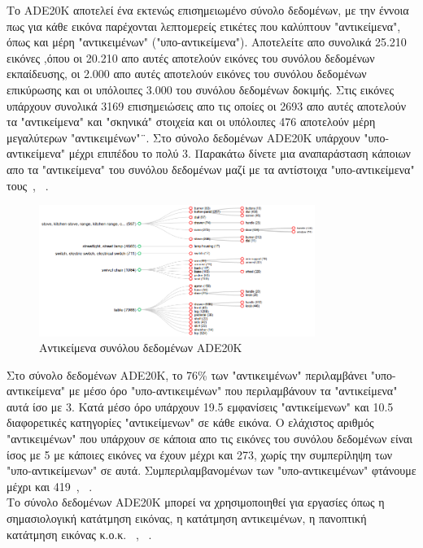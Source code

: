 \documentclass[12pt]{article}
\numberwithin{equation}{section}
\begin{document}
Το ADE20K αποτελεί ένα εκτενώς επισημειωμένο σύνολο δεδομένων, με την έννοια πως για κάθε εικόνα παρέχονται λεπτομερείς ετικέτες που καλύπτουν "αντικείμενα", όπως και μέρη "αντικειμένων" ("υπο-αντικείμενα"). Αποτελείτε απο συνολικά 25.210 εικόνες ,όπου οι 20.210 απο αυτές αποτελούν εικόνες του συνόλου δεδομένων εκπαίδευσης,  οι 2.000 απο αυτές αποτελούν εικόνες του συνόλου δεδομένων επικύρωσης και οι υπόλοιπες 3.000 του συνόλου δεδομένων δοκιμής. Στις εικόνες υπάρχουν συνολικά 3169 επισημειώσεις απο τις οποίες οι 2693 απο αυτές αποτελούν τα "αντικείμενα" και "σκηνικά" στοιχεία και οι υπόλοιπες 476 αποτελούν μέρη μεγαλύτερων "αντικειμένων"¨. Στο σύνολο δεδομένων ADE20K υπάρχουν "υπο-αντικείμενα" μέχρι επιπέδου το πολύ 3. Παρακάτω δίνετε μια αναπαράσταση κάποιων απο τα "αντικείμενα" του συνόλου δεδομένων μαζί με τα αντίστοιχα "υπο-αντικείμενα" τους~\cite{8100027}, ~\cite{zhou2018semanticunderstandingscenesade20k}. \\

\begin{figure}[h!]
  \centering
  \includegraphics[width=0.8\textwidth]{images/ADE20K_objects.png} %
  \caption{Αντικείμενα συνόλου δεδομένων ADE20K}
  \label{figure 8}
\end{figure}

Στο σύνολο δεδομένων ADE20K, το 76\% των "αντικειμένων" περιλαμβάνει "υπο-αντικείμενα" με μέσο όρο "υπο-αντικειμένων" που περιλαμβάνουν τα "αντικείμενα" αυτά ίσο με 3. Κατά μέσο όρο υπάρχουν 19.5 εμφανίσεις "αντικείμενων" και 10.5 διαφορετικές κατηγορίες "αντικείμενων" σε κάθε εικόνα. Ο ελάχιστος αριθμός "αντικειμένων" που υπάρχουν σε κάποια απο τις εικόνες του συνόλου δεδομένων είναι ίσος με 5 με κάποιες εικόνες να έχουν μέχρι και 273, χωρίς την συμπερίληψη των "υπο-αντικείμενων" σε αυτά. Συμπεριλαμβανομένων των "υπο-αντικειμένων" φτάνουμε μέχρι και 419~\cite{8100027}, ~\cite{zhou2018semanticunderstandingscenesade20k}. \\

Το σύνολο δεδομένων ADE20K μπορεί να χρησιμοποιηθεί για εργασίες όπως η σημασιολογική κατάτμηση εικόνας, η κατάτμηση αντικειμένων, η πανοπτική κατάτμηση εικόνας κ.ο.κ. ~\cite{8100027}, ~\cite{cheng2022maskedattentionmasktransformeruniversal}.
\end{document}

